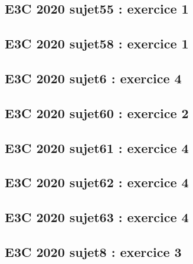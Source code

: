 \documentclass[lang=fr,edition=teacher,layout=sheet]{mxbook}
\begin{document}
\par\bigskip
{}\subsection*{E3C 2020 sujet55 : exercice 1}
\begingroup\endgroup
\par\bigskip
{}\subsection*{E3C 2020 sujet58 : exercice 1}
\begingroup\endgroup
\par\bigskip
{}\subsection*{E3C 2020 sujet6 : exercice 4}
\begingroup\endgroup
\par\bigskip
{}\subsection*{E3C 2020 sujet60 : exercice 2}
\begingroup\endgroup
\par\bigskip
{}\subsection*{E3C 2020 sujet61 : exercice 4}
\begingroup\endgroup
\par\bigskip
{}\subsection*{E3C 2020 sujet62 : exercice 4}
\begingroup\endgroup
\par\bigskip
{}\subsection*{E3C 2020 sujet63 : exercice 4}
\begingroup\endgroup
\par\bigskip
{}\subsection*{E3C 2020 sujet8 : exercice 3}
\end{document}

